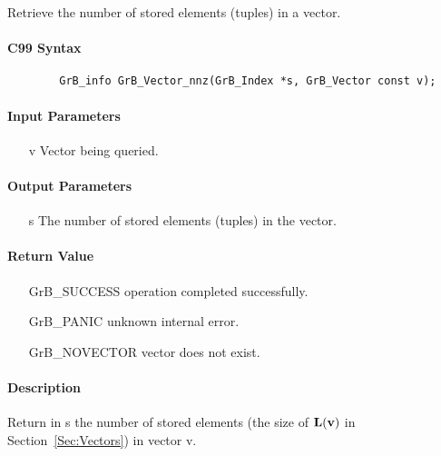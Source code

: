 Retrieve the number of stored elements (tuples) in a vector.

\paragraph{C99 Syntax}

\begin{verbatim}
        GrB_info GrB_Vector_nnz(GrB_Index *s, GrB_Vector const v);
\end{verbatim}

\paragraph{Input Parameters}

\begin{itemize}[leftmargin=1.1in]
    \item[{\sf v}] Vector being queried.
\end{itemize}

\paragraph{Output Parameters}
\begin{itemize}[leftmargin=1.1in]
    \item[{\sf s}] The number of stored elements (tuples) in the vector.
\end{itemize}

\paragraph{Return Value}

\begin{itemize}[leftmargin=2.1in]
\item[{\sf GrB\_SUCCESS}]   operation completed successfully.
\item[{\sf GrB\_PANIC}]     unknown internal error.
\item[{\sf GrB\_NOVECTOR}]  vector does not exist.
\end{itemize}

\paragraph{Description}

Return in {\sf s} the number of stored elements (the size of $\bold{L}({\bf v})$
in Section~\ref{Sec:Vectors}) in vector {\sf v}.


